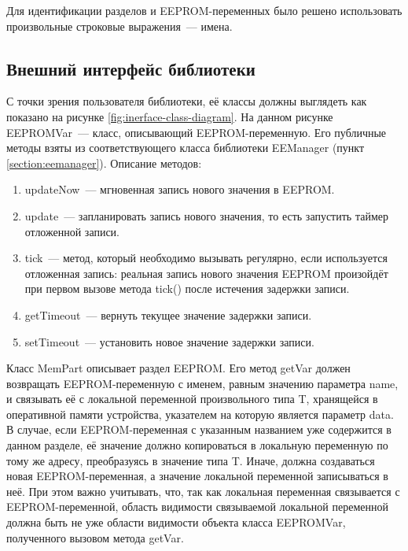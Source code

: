 Для идентификации разделов и EEPROM-переменных было решено использовать произвольные строковые выражения~--- имена.



\subsection{Внешний интерфейс библиотеки}

С точки зрения пользователя библиотеки, её классы должны выглядеть как показано на рисунке \ref{fig:inerface-class-diagram}.
На данном рисунке EEPROMVar~--- класс, описывающий EEPROM-переменную.
Его публичные методы взяты из соответствующего класса библиотеки EEManager (пункт \ref{section:eemanager}).
Описание методов:
\begin{enumerate}
	\item updateNow~--- мгновенная запись нового значения в EEPROM.
	\item update~--- запланировать запись нового значения, то есть запустить таймер отложенной записи.
	\item tick~--- метод, который необходимо вызывать регулярно, если используется отложенная запись: реальная запись нового значения EEPROM произойдёт при первом вызове метода tick() после истечения задержки записи.
	\item getTimeout~--- вернуть текущее значение задержки записи.
	\item setTimeout~--- установить новое значение задержки записи.
\end{enumerate}

Класс MemPart описывает раздел EEPROM.
Его метод getVar должен возвращать EEPROM-переменную с именем, равным значению параметра name, и связывать её с локальной переменной произвольного типа T, хранящейся в оперативной памяти устройства, указателем на которую является параметр data.
В случае, если EEPROM-переменная с указанным названием уже содержится в данном разделе, её значение должно копироваться в локальную переменную по тому же адресу, преобразуясь в значение типа T.
Иначе, должна создаваться новая EEPROM-переменная, а значение локальной переменной записываться в неё.
При этом важно учитывать, что, так как локальная переменная связывается с EEPROM-переменной, область видимости связываемой локальной переменной должна быть не уже области видимости объекта класса EEPROMVar, полученного вызовом метода getVar.

